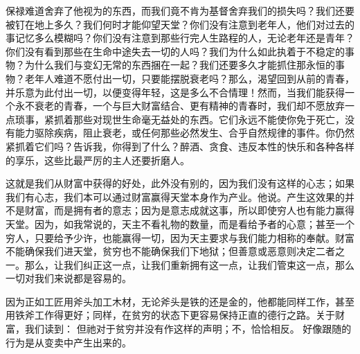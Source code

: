 保禄难道舍弃了他视为的东西，而我们竟不肯为基督舍弃我们的损失吗？我们还要被钉在地上多久？我们何时才能仰望天堂？你们没有注意到老年人，他们对过去的事记忆多么模糊吗？你们没有注意到那些行完人生路程的人，无论老年还是青年？你们没有看到那些在生命中途失去一切的人吗？我们为什么如此执着于不稳定的事物？为什么我们与变幻无常的东西捆在一起？我们还要多久才能抓住那永恒的事物？老年人难道不愿付出一切，只要能摆脱衰老吗？那么，渴望回到从前的青春，并乐意为此付出一切，以便变得年轻，这是多么不合情理！然而，当我们能获得一个永不衰老的青春，一个与巨大财富结合、更有精神的青春时，我们却不愿放弃一点琐事，紧抓着那些对现世生命毫无益处的东西。它们永远不能使你免于死亡，没有能力驱除疾病，阻止衰老，或任何那些必然发生、合乎自然规律的事件。你仍然紧抓着它们吗？告诉我，你得到了什么？醉酒、贪食、违反本性的快乐和各种各样的享乐，这些比最严厉的主人还要折磨人。\par

这就是我们从财富中获得的好处，此外没有别的，因为我们没有这样的心志；如果我们有心志，我们本可以通过财富赢得天堂本身作为产业。他说。产生这效果的并不是财富，而是拥有者的意志；因为是意志成就这事，所以即使穷人也有能力赢得天堂。因为，如我常说的，天主不看礼物的数量，而是看给予者的心意；甚至一个穷人，只要给予少许，也能赢得一切，因为天主要求与我们能力相称的奉献。财富不能确保我们进天堂，贫穷也不能确保我们下地狱；但善意或恶意则决定二者之一。那么，让我们纠正这一点，让我们重新拥有这一点，让我们管束这一点，那么一切对我们来说都是容易的。\par

因为正如工匠用斧头加工木材，无论斧头是铁的还是金的，他都能同样工作，甚至用铁斧工作得更好；同样，在贫穷的状态下更容易保持正直的德行之路。关于财富，我们读到： 但祂对于贫穷并没有作这样的声明；不，恰恰相反。 好像跟随的行为是从变卖中产生出来的。\par

